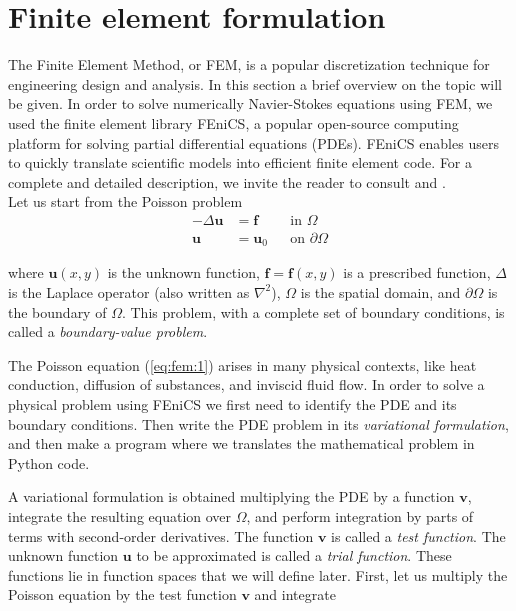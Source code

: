 \documentclass[a4paper,11pt,openright,twoside]{book}
\begin{document}
\section{Finite element formulation}
The Finite Element Method, or FEM, is a popular discretization technique for engineering design and analysis. In this section a brief overview on the topic will be given. In order to solve numerically Navier-Stokes equations using FEM, we used the finite element library FEniCS, a popular open-source computing platform for solving partial differential equations (PDEs). FEniCS enables users to quickly translate scientific models into efficient finite element code. For a complete and detailed description, we invite the reader to consult \cite{quarteroni1} and \cite{logg}. \\

Let us start from the Poisson problem
\begin{align}
\label{eq:fem:1}
- \Delta \mathbf{u} &= \mathbf{f} &&\text{in } \Omega \\
\mathbf{u} &= \mathbf{u}_0 &&\text{on } \partial \Omega
\end{align}

where $\mathbf{u}(x,y)$ is the unknown function, $\mathbf{f} = \mathbf{f}(x,y)$ is a prescribed function, $\Delta$ is the Laplace operator (also written as $\nabla^2$), $\Omega$ is the spatial domain, and $\partial \Omega$ is the boundary of $\Omega$. This problem, with a complete set of boundary conditions, is called a \emph{boundary-value problem}.

The Poisson equation (\ref{eq:fem:1}) arises in many physical contexts, like heat conduction, diffusion of substances, and inviscid fluid flow. In order to solve a physical problem using FEniCS we first need to identify the PDE and its boundary conditions. Then write the PDE problem in its \emph{variational formulation}, and then make a program where we translates the mathematical problem in Python code.

A variational formulation is obtained multiplying the PDE by a function $\mathbf{v}$, integrate the resulting equation over $\Omega$, and perform integration by parts of terms with second-order derivatives. The function $\mathbf{v}$ is called a \emph{test function}. The unknown function $\mathbf{u}$ to be approximated is called a \emph{trial function}. These functions lie in function spaces that we will define later. First, let us multiply the Poisson equation by the test function $\mathbf{v}$ and integrate
\end{document}
